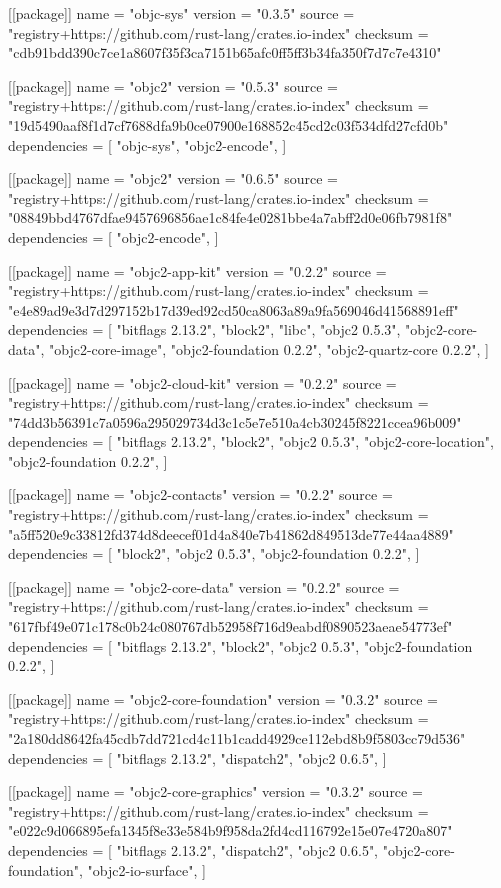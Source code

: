 [[package]]
name = "objc-sys"
version = "0.3.5"
source = "registry+https://github.com/rust-lang/crates.io-index"
checksum = "cdb91bdd390c7ce1a8607f35f3ca7151b65afc0ff5ff3b34fa350f7d7c7e4310"

[[package]]
name = "objc2"
version = "0.5.3"
source = "registry+https://github.com/rust-lang/crates.io-index"
checksum = "19d5490aaf8f1d7cf7688dfa9b0ce07900e168852c45cd2c03f534dfd27cfd0b"
dependencies = [
 "objc-sys",
 "objc2-encode",
]

[[package]]
name = "objc2"
version = "0.6.5"
source = "registry+https://github.com/rust-lang/crates.io-index"
checksum = "08849bbd4767dfae9457696856ae1c84fe4e0281bbe4a7abff2d0e06fb7981f8"
dependencies = [
 "objc2-encode",
]

[[package]]
name = "objc2-app-kit"
version = "0.2.2"
source = "registry+https://github.com/rust-lang/crates.io-index"
checksum = "e4e89ad9e3d7d297152b17d39ed92cd50ca8063a89a9fa569046d41568891eff"
dependencies = [
 "bitflags 2.13.2",
 "block2",
 "libc",
 "objc2 0.5.3",
 "objc2-core-data",
 "objc2-core-image",
 "objc2-foundation 0.2.2",
 "objc2-quartz-core 0.2.2",
]

[[package]]
name = "objc2-cloud-kit"
version = "0.2.2"
source = "registry+https://github.com/rust-lang/crates.io-index"
checksum = "74dd3b56391c7a0596a295029734d3c1c5e7e510a4cb30245f8221ccea96b009"
dependencies = [
 "bitflags 2.13.2",
 "block2",
 "objc2 0.5.3",
 "objc2-core-location",
 "objc2-foundation 0.2.2",
]

[[package]]
name = "objc2-contacts"
version = "0.2.2"
source = "registry+https://github.com/rust-lang/crates.io-index"
checksum = "a5ff520e9c33812fd374d8deecef01d4a840e7b41862d849513de77e44aa4889"
dependencies = [
 "block2",
 "objc2 0.5.3",
 "objc2-foundation 0.2.2",
]

[[package]]
name = "objc2-core-data"
version = "0.2.2"
source = "registry+https://github.com/rust-lang/crates.io-index"
checksum = "617fbf49e071c178c0b24c080767db52958f716d9eabdf0890523aeae54773ef"
dependencies = [
 "bitflags 2.13.2",
 "block2",
 "objc2 0.5.3",
 "objc2-foundation 0.2.2",
]

[[package]]
name = "objc2-core-foundation"
version = "0.3.2"
source = "registry+https://github.com/rust-lang/crates.io-index"
checksum = "2a180dd8642fa45cdb7dd721cd4c11b1cadd4929ce112ebd8b9f5803cc79d536"
dependencies = [
 "bitflags 2.13.2",
 "dispatch2",
 "objc2 0.6.5",
]

[[package]]
name = "objc2-core-graphics"
version = "0.3.2"
source = "registry+https://github.com/rust-lang/crates.io-index"
checksum = "e022c9d066895efa1345f8e33e584b9f958da2fd4cd116792e15e07e4720a807"
dependencies = [
 "bitflags 2.13.2",
 "dispatch2",
 "objc2 0.6.5",
 "objc2-core-foundation",
 "objc2-io-surface",
]

